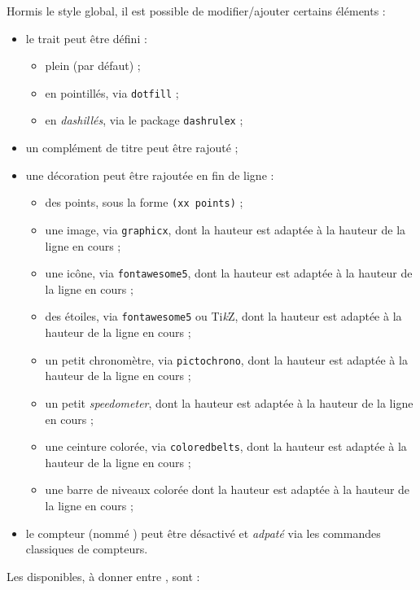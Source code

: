 \documentclass[french,11pt,a4paper]{article}
\providecommand\tikzlogo{Ti\textit{k}Z}
\let\TikZ\tikzlogo
\begin{document}
Hormis le style global, il est possible de modifier/ajouter certains éléments :

\begin{itemize}
	\item le trait peut être défini :
	\begin{itemize}
		\item plein (par défaut) ;
		\item en pointillés, via \texttt{dotfill} ;
		\item en \textit{dashillés}, via le package \texttt{dashrulex} ;
	\end{itemize}
	\item un complément de titre peut être rajouté ;
	\item une décoration peut être rajoutée en fin de ligne :
	\begin{itemize}
		\item des points, sous la forme \texttt{(xx points)} ;
		\item une image, via \texttt{graphicx}, dont la hauteur est adaptée à la hauteur de la ligne en cours ;
		\item une icône, via \texttt{fontawesome5}, dont la hauteur est adaptée à la hauteur de la ligne en cours ;
		\item des étoiles, via \texttt{fontawesome5} ou \TikZ, dont la hauteur est adaptée à la hauteur de la ligne en cours ;
		\item un petit chronomètre, via \texttt{pictochrono}, dont la hauteur est adaptée à la hauteur de la ligne en cours ;
		\item un petit \textit{speedometer}, dont la hauteur est adaptée à la hauteur de la ligne en cours ;
		\item une ceinture colorée, via \texttt{coloredbelts}, dont la hauteur est adaptée à la hauteur de la ligne en cours ;
		\item une barre de niveaux colorée dont la hauteur est adaptée à la hauteur de la ligne en cours ;
	\end{itemize}
	\item le compteur (nommé ) peut être désactivé et \textit{adpaté} via les commandes classiques de compteurs.
\end{itemize}

Les  disponibles, à donner entre \MontreCode{[...]}, sont :
\end{document}
